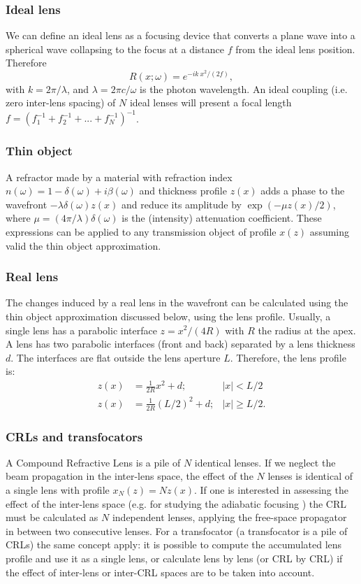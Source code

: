\documentclass{iucr}              %
\begin{document}
\subsubsection{Ideal lens}
We can define an ideal lens as a focusing device that converts a plane wave into a spherical wave collapsing to the focus at a distance $f$ from the ideal lens position. Therefore
\begin{equation}
    R(x;\omega) = e^{-i k~x^2/(2 f)},
\end{equation}
with $k=2\pi/\lambda$, and $\lambda=2\pi c/\omega$ is the photon wavelength. 
An ideal coupling (i.e. zero inter-lens spacing) of $N$ ideal lenses will present a focal length $f=(f_1^{-1}+f_2^{-1}+...+f_N^{-1})^{-1}$. 

\subsubsection{Thin object} A refractor made by a material with refraction index $n(\omega)=1-\delta(\omega)+i\beta(\omega)$ 
and thickness profile $z(x)$ adds a phase to the wavefront $-\lambda \delta(\omega) z(x)$ and reduce its amplitude by $\exp(-\mu z(x)/2)$, where $\mu=(4 \pi/\lambda) \delta(\omega)$ is the (intensity) attenuation coefficient. These expressions can be applied to any transmission object of profile $x(z)$ assuming valid the thin object approximation. 


\subsubsection{Real lens} The changes induced by a real lens in the wavefront can be calculated using the thin object approximation discussed below, using the lens profile. Usually, a single lens has a parabolic interface $z=x^2/(4R)$ with $R$ the radius at the apex. A lens has two parabolic interfaces (front and back) separated by a lens thickness $d$. The interfaces are flat outside the lens aperture $L$. Therefore, the lens profile is:
\begin{align}
    z(x) &= \frac{1}{2R} x^2 + d; & |x| < L/2\\ \nonumber
    z(x) &= \frac{1}{2R} (L/2)^2 + d; & |x| \ge L/2.
\end{align}

\subsubsection{CRLs and transfocators}
A Compound Refractive Lens is a pile of $N$ identical lenses. If we neglect the beam propagation in the inter-lens space, the effect of the $N$ lenses is identical of a single lens with profile $x_N(z)=N z(x)$. If one is interested in assessing the effect of the inter-lens space (e.g. for studying the adiabatic focusing \cite{Schroer_adiabatic}) the CRL must be calculated as $N$ independent lenses, applying the free-space propagator in between two consecutive lenses. For a transfocator (a transfocator is a pile of CRLs) the same concept apply: it is possible to compute the accumulated lens profile and use it as a single lens, or calculate lens by lens (or CRL by CRL) if the effect of inter-lens or inter-CRL spaces are to be taken into account.
\end{document}
